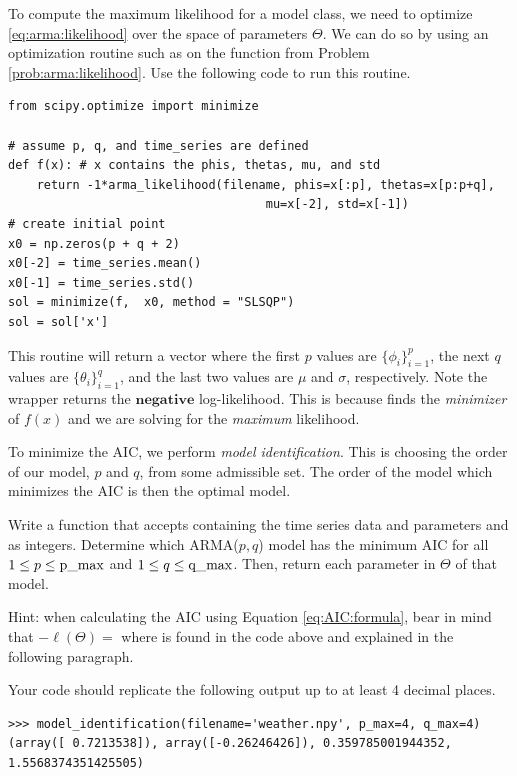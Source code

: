 To compute the maximum likelihood for a model class, we need to optimize
\ref{eq:arma:likelihood} over the space of parameters $\Theta$. We can do so
by using an optimization routine such as  on the function  from Problem \ref{prob:arma:likelihood}.
Use the following code to run this routine.

\begin{lstlisting}
from scipy.optimize import minimize

# assume p, q, and time_series are defined
def f(x): # x contains the phis, thetas, mu, and std
    return -1*arma_likelihood(filename, phis=x[:p], thetas=x[p:p+q], 
                                    mu=x[-2], std=x[-1])
# create initial point
x0 = np.zeros(p + q + 2)
x0[-2] = time_series.mean()
x0[-1] = time_series.std()
sol = minimize(f,  x0, method = "SLSQP")
sol = sol['x']
\end{lstlisting}

This routine will return a vector  where the first $p$ values are $\{\phi_i\}_{i=1}^p$, the next $q$ values are $\{\theta_i\}_{i=1}^q$, and the last two values are $\mu$ and $\sigma$, respectively.
Note the wrapper  returns the $\mathbf{negative}$ log-likelihood.
This is because  finds the \emph{minimizer} of $f(x)$ and we are solving for the \emph{maximum} likelihood.

To minimize the AIC, we perform \emph{model identification}.
This is choosing the order of our model, $p$ and $q$, from some admissible set.
The order of the model which minimizes the AIC is then the optimal model.

\begin{problem}
\label{prob:model-identification}
Write a function  that accepts  containing the time series data and parameters  and  as integers. 
Determine which ARMA($p,q$) model has the minimum AIC for all $1\leq p \leq \text{\li{p_max}}$ and $1\leq q \leq \text{\li{q_max}}$.
Then, return each parameter in $\Theta$ of that model.

\noindent Hint: when calculating the AIC using Equation \ref{eq:AIC:formula}, bear in mind that $-\ell(\Theta)=$  where  is found in the code above and explained in the following paragraph.

Your code should replicate the following output up to at least 4 decimal places.
\begin{lstlisting}
>>> model_identification(filename='weather.npy', p_max=4, q_max=4)
(array([ 0.7213538]), array([-0.26246426]), 0.359785001944352, 1.5568374351425505)
\end{lstlisting}
\end{problem}

